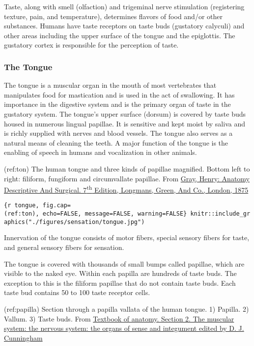 Taste, along with smell (olfaction) and trigeminal nerve stimulation
(registering texture, pain, and temperature), determines flavors of food
and/or other substances. Humans have taste receptors on taste buds
(gustatory calyculi) and other areas including the upper surface of the
tongue and the epiglottis. The gustatory cortex is responsible for the
perception of taste.

\hypertarget{the-tongue}{%
\subsubsection{The Tongue}\label{the-tongue}}

The tongue is a muscular organ in the mouth of most vertebrates that
manipulates food for mastication and is used in the act of swallowing.
It has importance in the digestive system and is the primary organ of
taste in the gustatory system. The tongue's upper surface (dorsum) is
covered by taste buds housed in numerous lingual papillae. It is
sensitive and kept moist by saliva and is richly supplied with nerves
and blood vessels. The tongue also serves as a natural means of cleaning
the teeth. A major function of the tongue is the enabling of speech in
humans and vocalization in other animals.

(ref:ton) The human tongue and three kinds of papillae magnified. Bottom
left to right: filiform, fungiform and circumvallate papillae. From
\href{https://wellcomelibrary.org/item/b21688692}{Gray, Henry: Anatomy
Descriptive And Surgical. 7\textsuperscript{th} Edition, Longmans,
Green, And Co., London, 1875}

\texttt{\{r\ tongue,\ fig.cap=\textquotesingle{}(ref:ton)\textquotesingle{},\ echo=FALSE,\ message=FALSE,\ warning=FALSE\}\ knitr::include\_graphics("./figures/sensation/tongue.jpg")}

Innervation of the tongue consists of motor fibers, special sensory
fibers for taste, and general sensory fibers for sensation.

The tongue is covered with thousands of small bumps called papillae,
which are visible to the naked eye. Within each papilla are hundreds of
taste buds. The exception to this is the filiform papillae that do not
contain taste buds. Each taste bud contains 50 to 100 taste receptor
cells.

(ref:papilla) Section through a papilla vallata of the human tongue. 1)
Papilla. 2) Vallum. 3) Taste buds. From
\href{https://wellcomelibrary.org/item/b21271070}{Textbook of anatomy.
Section 2. The muscular system: the nervous system: the organs of sense
and integument edited by D. J. Cunningham}

